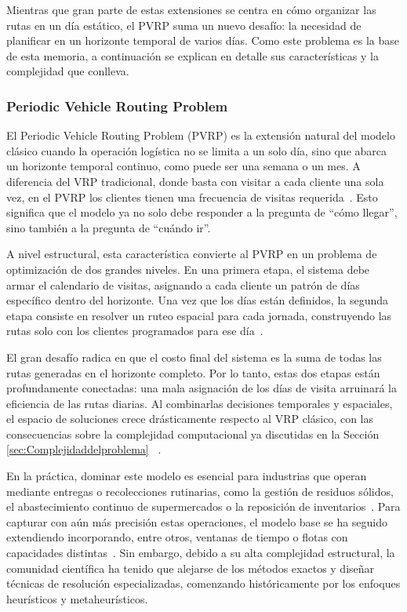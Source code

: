 Mientras que gran parte de estas extensiones se centra en cómo organizar las rutas en un día estático, el PVRP suma un nuevo desafío: la necesidad de planificar en un horizonte temporal de varios días. Como este problema es la base de esta memoria, a continuación se explican en detalle sus características y la complejidad que conlleva.

\subsubsection{Periodic Vehicle Routing Problem} \label{sec:PeriodicVehicleRoutingProblem}
El Periodic Vehicle Routing Problem (PVRP) es la extensión natural del modelo clásico cuando la operación logística no se limita a un solo día, sino que abarca un horizonte temporal continuo, como puede ser una semana o un mes. A diferencia del VRP tradicional, donde basta con visitar a cada cliente una sola vez, en el PVRP los clientes tienen una frecuencia de visitas requerida~\cite{HEMMELMAYR2009791}. Esto significa que el modelo ya no solo debe responder a la pregunta de \enquote{cómo llegar}, sino también a la pregunta de \enquote{cuándo ir}.

A nivel estructural, esta característica convierte al PVRP en un problema de optimización de dos grandes niveles. En una primera etapa, el sistema debe armar el calendario de visitas, asignando a cada cliente un patrón de días específico dentro del horizonte. Una vez que los días están definidos, la segunda etapa consiste en resolver un ruteo espacial para cada jornada, construyendo las rutas solo con los clientes programados para ese día~\cite{Francis, HEMMELMAYR2009791}. 

El gran desafío radica en que el costo final del sistema es la suma de todas las rutas generadas en el horizonte completo. Por lo tanto, estas dos etapas están profundamente conectadas: una mala asignación de los días de visita arruinará la eficiencia de las rutas diarias. Al combinarlas decisiones temporales y espaciales, el espacio de soluciones crece drásticamente respecto al VRP clásico, con las consecuencias sobre la complejidad computacional ya discutidas en la Sección \ref{sec:Complejidaddelproblema} ~\cite{EKSIOGLU20091472}.

En la práctica, dominar este modelo es esencial para industrias que operan mediante entregas o recolecciones rutinarias, como la gestión de residuos sólidos, el abastecimiento continuo de supermercados o la reposición de inventarios~\cite{Pangaribuan}. Para capturar con aún más precisión estas operaciones, el modelo base se ha seguido extendiendo incorporando, entre otros, ventanas de tiempo o flotas con capacidades distintas~\cite{HEMMELMAYR2009791}. Sin embargo, debido a su alta complejidad estructural, la comunidad científica ha tenido que alejarse de los métodos exactos y diseñar técnicas de resolución especializadas, comenzando históricamente por los enfoques heurísticos y metaheurísticos.

